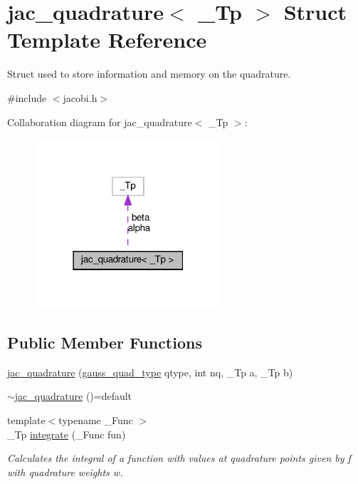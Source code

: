\hypertarget{structjac__quadrature}{}\section{jac\+\_\+quadrature$<$ \+\_\+\+Tp $>$ Struct Template Reference}
\label{structjac__quadrature}


Struct used to store information and memory on the quadrature.  




{\ttfamily \#include $<$jacobi.\+h$>$}



Collaboration diagram for jac\+\_\+quadrature$<$ \+\_\+\+Tp $>$\+:
\nopagebreak
\begin{figure}[H]
\begin{center}
\leavevmode
\includegraphics[width=195pt]{structjac__quadrature__coll__graph}
\end{center}
\end{figure}
\subsection*{Public Member Functions}
\begin{DoxyCompactItemize}
\item 
\hyperlink{structjac__quadrature_a0d4d6c5fbb285c4b6d63e59579bb86a0}{jac\+\_\+quadrature} (\hyperlink{jacobi_8h_a58cc26f41a96f9220797038d2d3b4c8a}{gauss\+\_\+quad\+\_\+type} qtype, int nq, \+\_\+\+Tp a, \+\_\+\+Tp b)
\item 
\hyperlink{structjac__quadrature_adca300f6457471f03b0392b4d6bc5aea}{$\sim$jac\+\_\+quadrature} ()=default
\item 
{\footnotesize template$<$typename \+\_\+\+Func $>$ }\\\+\_\+\+Tp \hyperlink{structjac__quadrature_a428a88c5ee5e6b5caae2dd312639297d}{integrate} (\+\_\+\+Func fun)
\begin{DoxyCompactList}\small\item\em Calculates the integral of a function with values at quadrature points given by f with quadrature weights w. \end{DoxyCompactList}\end{DoxyCompactItemize}
